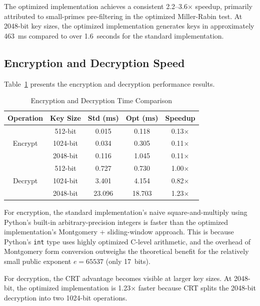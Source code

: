 \documentclass[journal]{IEEEtran}
\begin{document}
The optimized implementation achieves a consistent 2.2--3.6$\times$ speedup, primarily attributed to small-primes pre-filtering in the optimized Miller-Rabin test. At 2048-bit key sizes, the optimized implementation generates keys in approximately 463~ms compared to over 1.6~seconds for the standard implementation.

\subsection{Encryption and Decryption Speed}

Table~\ref{tab:encdec} presents the encryption and decryption performance results.

\begin{table}[!t]
\caption{Encryption and Decryption Time Comparison}
\label{tab:encdec}
\centering
\begin{tabular}{|c|c|c|c|c|}
\hline
\textbf{Operation} & \textbf{Key Size} & \textbf{Std (ms)} & \textbf{Opt (ms)} & \textbf{Speedup} \\
\hline
\multirow{3}{*}{Encrypt} & 512-bit & 0.015 & 0.118 & 0.13$\times$ \\
\cline{2-5}
 & 1024-bit & 0.034 & 0.305 & 0.11$\times$ \\
\cline{2-5}
 & 2048-bit & 0.116 & 1.045 & 0.11$\times$ \\
\hline
\multirow{3}{*}{Decrypt} & 512-bit & 0.727 & 0.730 & 1.00$\times$ \\
\cline{2-5}
 & 1024-bit & 3.401 & 4.154 & 0.82$\times$ \\
\cline{2-5}
 & 2048-bit & 23.096 & 18.703 & 1.23$\times$ \\
\hline
\end{tabular}
\end{table}

For encryption, the standard implementation's naive square-and-multiply using Python's built-in arbitrary-precision integers is faster than the optimized implementation's Montgomery + sliding-window approach. This is because Python's \texttt{int} type uses highly optimized C-level arithmetic, and the overhead of Montgomery form conversion outweighs the theoretical benefit for the relatively small public exponent $e = 65537$ (only 17~bits).

For decryption, the CRT advantage becomes visible at larger key sizes. At 2048-bit, the optimized implementation is 1.23$\times$ faster because CRT splits the 2048-bit decryption into two 1024-bit operations.
\end{document}
